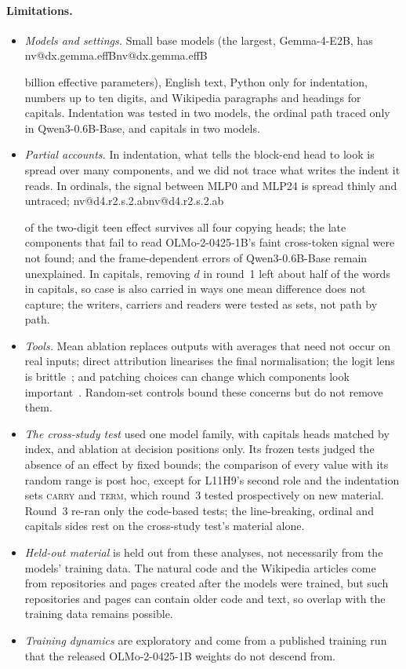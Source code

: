 \documentclass[11pt]{article}
\makeatletter
\newcommand{\nv}[1]{\ifcsname nv@#1\endcsname\csname nv@#1\endcsname\else\PackageError{numbers}{Unknown number key #1}{}\fi}
\newcommand{\hd}[2]{L#1H#2}
\newcommand{\mlp}[1]{MLP#1}
\newcommand{\term}{\textsc{term}}
\newcommand{\carry}{\textsc{carry}}
\newcommand{\qsix}{Qwen3-0.6B-Base}
\newcommand{\olmo}{OLMo-2-0425-1B}
\newcommand{\gm}{Gemma-4-E2B}
\makeatother
\begin{document}
\paragraph{Limitations.}
\begin{itemize}
\item \emph{Models and settings.} Small base models (the largest, \gm{}, has \nv{dx.gemma.effB} billion effective parameters), English text, Python only for indentation, numbers up to ten digits, and Wikipedia paragraphs and headings for capitals. Indentation was tested in two models, the ordinal path traced only in \qsix{}, and capitals in two models.
\item \emph{Partial accounts.} In indentation, what tells the block-end head to look is spread over many components, and we did not trace what writes the indent it reads. In ordinals, the signal between \mlp{0} and \mlp{24} is spread thinly and untraced; \nv{d4.r2.s.2.ab} of the two-digit teen effect survives all four copying heads; the late components that fail to read \olmo{}'s faint cross-token signal were not found; and the frame-dependent errors of \qsix{} remain unexplained. In capitals, removing $d$ in round~1 left about half of the words in capitals, so case is also carried in ways one mean difference does not capture; the writers, carriers and readers were tested as sets, not path by path.
\item \emph{Tools.} Mean ablation replaces outputs with averages that need not occur on real inputs; direct attribution linearises the final normalisation; the logit lens is brittle~\citep{belrose2023tuned}; and patching choices can change which components look important~\citep{heimersheim2024patching,zhang2024patching}. Random-set controls bound these concerns but do not remove them.
\item \emph{The cross-study test} used one model family, with capitals heads matched by index, and ablation at decision positions only. Its frozen tests judged the absence of an effect by fixed bounds; the comparison of every value with its random range is post hoc, except for \hd{11}{9}'s second role and the indentation sets \carry{} and \term{}, which round~3 tested prospectively on new material. Round~3 re-ran only the code-based tests; the line-breaking, ordinal and capitals sides rest on the cross-study test's material alone.
\item \emph{Held-out material} is held out from these analyses, not necessarily from the models' training data. The natural code and the Wikipedia articles come from repositories and pages created after the models were trained, but such repositories and pages can contain older code and text, so overlap with the training data remains possible.
\item \emph{Training dynamics} are exploratory and come from a published training run that the released \olmo{} weights do not descend from.
\end{itemize}
\end{document}
